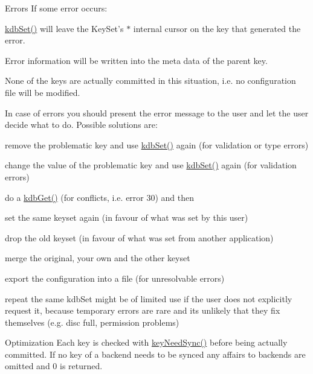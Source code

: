 \begin{DoxyParagraph}{Errors}
If some error occurs\+:
\begin{DoxyItemize}
\item \hyperlink{group__kdb_ga11436b058408f83d303ca5e996832bcf}{kdb\+Set()} will leave the Key\+Set's $\ast$ internal cursor on the key that generated the error.
\item Error information will be written into the meta data of the parent key.
\item None of the keys are actually committed in this situation, i.\+e. no configuration file will be modified.
\end{DoxyItemize}
\end{DoxyParagraph}
In case of errors you should present the error message to the user and let the user decide what to do. Possible solutions are\+:
\begin{DoxyItemize}
\item remove the problematic key and use \hyperlink{group__kdb_ga11436b058408f83d303ca5e996832bcf}{kdb\+Set()} again (for validation or type errors)
\item change the value of the problematic key and use \hyperlink{group__kdb_ga11436b058408f83d303ca5e996832bcf}{kdb\+Set()} again (for validation errors)
\item do a \hyperlink{group__kdb_ga28e385fd9cb7ccfe0b2f1ed2f62453a1}{kdb\+Get()} (for conflicts, i.\+e. error 30) and then
\begin{DoxyItemize}
\item set the same keyset again (in favour of what was set by this user)
\item drop the old keyset (in favour of what was set from another application)
\item merge the original, your own and the other keyset
\end{DoxyItemize}
\item export the configuration into a file (for unresolvable errors)
\item repeat the same kdb\+Set might be of limited use if the user does not explicitly request it, because temporary errors are rare and its unlikely that they fix themselves (e.\+g. disc full, permission problems)
\end{DoxyItemize}

\begin{DoxyParagraph}{Optimization}
Each key is checked with \hyperlink{group__keytest_gaf247df0de7aca04b32ef80e39ef12950}{key\+Need\+Sync()} before being actually committed. If no key of a backend needs to be synced any affairs to backends are omitted and 0 is returned.
\end{DoxyParagraph}

